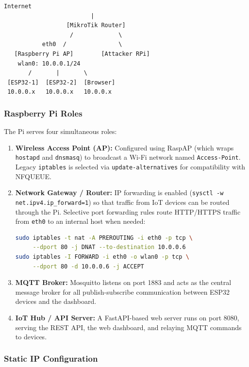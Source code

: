 \documentclass[12pt,a4paper]{article}
\begin{document}
\begin{lstlisting}[frame=none,backgroundcolor=\color{white}]
                      Internet
                         |
                  [MikroTik Router]
                   /             \
           eth0  /               \
   [Raspberry Pi AP]        [Attacker RPi]
    wlan0: 10.0.0.1/24
       /       |       \
 [ESP32-1]  [ESP32-2]  [Browser]
 10.0.0.x   10.0.0.x   10.0.0.x
\end{lstlisting}

\subsubsection*{Raspberry Pi Roles}

The Pi serves four simultaneous roles:

\begin{enumerate}
    \item \textbf{Wireless Access Point (AP):} Configured using RaspAP (which wraps \texttt{hostapd} and \texttt{dnsmasq}) to broadcast a Wi-Fi network named \texttt{Access-Point}. Legacy \texttt{iptables} is selected via \texttt{update-alternatives} for compatibility with NFQUEUE.

    \item \textbf{Network Gateway / Router:} IP forwarding is enabled (\texttt{sysctl -w net.ipv4.ip\_forward=1}) so that traffic from IoT devices can be routed through the Pi. Selective port forwarding rules route HTTP/HTTPS traffic from \texttt{eth0} to an internal host when needed:
    \begin{lstlisting}[language=bash,frame=none,backgroundcolor=\color{white}]
sudo iptables -t nat -A PREROUTING -i eth0 -p tcp \
     --dport 80 -j DNAT --to-destination 10.0.0.6
sudo iptables -I FORWARD -i eth0 -o wlan0 -p tcp \
     --dport 80 -d 10.0.0.6 -j ACCEPT
    \end{lstlisting}

    \item \textbf{MQTT Broker:} Mosquitto listens on port 1883 and acts as the central message broker for all publish-subscribe communication between ESP32 devices and the dashboard.

    \item \textbf{IoT Hub / API Server:} A FastAPI-based web server runs on port 8080, serving the REST API, the web dashboard, and relaying MQTT commands to devices.
\end{enumerate}

\subsubsection*{Static IP Configuration}
\end{document}
